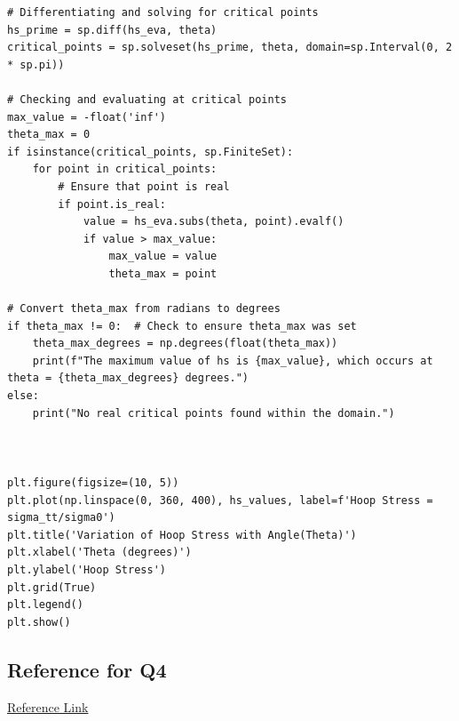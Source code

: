 \documentclass[12pt]{article} %
\begin{document}
\begin{lstlisting}
# Differentiating and solving for critical points
hs_prime = sp.diff(hs_eva, theta)
critical_points = sp.solveset(hs_prime, theta, domain=sp.Interval(0, 2 * sp.pi))

# Checking and evaluating at critical points
max_value = -float('inf')
theta_max = 0
if isinstance(critical_points, sp.FiniteSet):
    for point in critical_points:
        # Ensure that point is real
        if point.is_real:
            value = hs_eva.subs(theta, point).evalf()
            if value > max_value:
                max_value = value
                theta_max = point

# Convert theta_max from radians to degrees
if theta_max != 0:  # Check to ensure theta_max was set
    theta_max_degrees = np.degrees(float(theta_max))
    print(f"The maximum value of hs is {max_value}, which occurs at theta = {theta_max_degrees} degrees.")
else:
    print("No real critical points found within the domain.")



plt.figure(figsize=(10, 5))
plt.plot(np.linspace(0, 360, 400), hs_values, label=f'Hoop Stress = sigma_tt/sigma0')
plt.title('Variation of Hoop Stress with Angle(Theta)')
plt.xlabel('Theta (degrees)')
plt.ylabel('Hoop Stress')
plt.grid(True)
plt.legend()
plt.show()
\end{lstlisting}
\subsection*{Reference for Q4}
\href{https://www.brown.edu/Departments/Engineering/Courses/En221/Notes/Polar_Coords/Polar_Coords.htm}{Reference Link}
\end{document}
